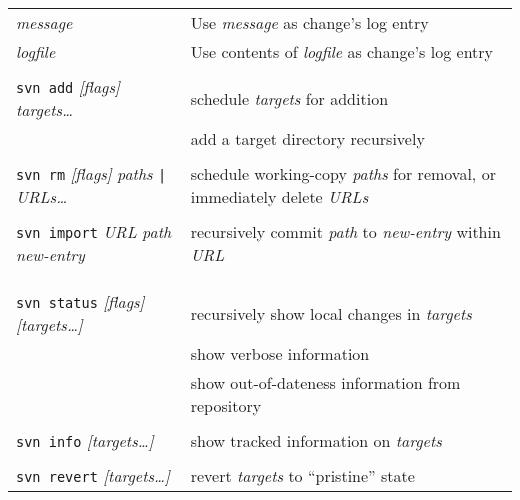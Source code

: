 \documentclass{report}
\begin{document}
\begin{tabular}{ll}
\hspace{0.5in}{\tt -m} {\sl message}		&
Use {\sl message} as change's log entry		 \\

\hspace{0.5in}{\tt -F} {\sl logfile}		&
Use contents of {\sl logfile} as change's log entry		 \\

\\
{\tt svn add} {\sl [flags]} {\sl targets\dots}    &
schedule {\sl targets} for addition		         \\

\hspace{0.5in}{\tt --recursive}		&
add a target directory recursively	 \\

\\
{\tt svn rm} {\sl [flags]} {\sl paths} \verb!|! {\sl URLs\dots}	&
schedule working-copy {\sl paths} for removal,
or immediately delete {\sl URLs}	 \\

\\
{\tt svn import} {\sl URL} {\sl path} {\sl new-entry}	&
recursively commit {\sl path} to {\sl new-entry} within {\sl URL} \\

\\
\\
\vspace{0.1in} \hspace{-0.1in}{\bf\Large Working Copy Maintenance} \\

{\tt svn status} {\sl [flags]} {\sl [targets\dots]}	&
recursively show local changes in {\sl targets}  \\

\hspace{0.5in}{\tt -v}		&
show verbose information		  \\

\hspace{0.5in}{\tt -u}		&
show out-of-dateness information from repository		  \\

\\
{\tt svn info} {\sl [targets\dots]}	&
show tracked information on {\sl targets}   \\

\\
{\tt svn revert} {\sl [targets\dots]}	&
revert {\sl targets} to ``pristine'' state   \\


\end{tabular}
\end{document}
